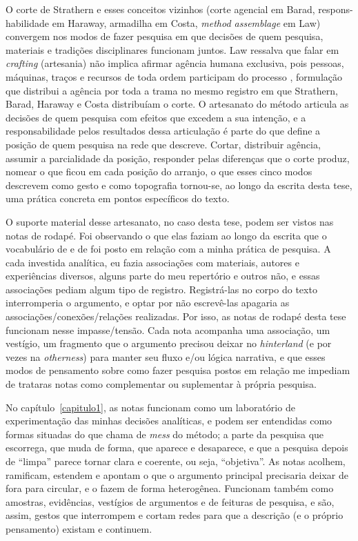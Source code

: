 O corte de Strathern e esses conceitos vizinhos (corte agencial em Barad, respons-habilidade em Haraway, armadilha em Costa, \textit{method assemblage} em Law) convergem nos modos de fazer pesquisa em que decisões de quem pesquisa, materiais e tradições disciplinares funcionam juntos. Law ressalva que falar em \textit{crafting} (artesania) não implica afirmar agência humana exclusiva, pois pessoas, máquinas, traços e recursos de toda ordem participam do processo \parencite[pp.~41--42]{Law2004After}, formulação que distribui a agência por toda a trama no mesmo registro em que Strathern, Barad, Haraway e Costa distribuíam o corte. O artesanato do método articula as decisões de quem pesquisa com efeitos que excedem a sua intenção, e a responsabilidade pelos resultados dessa articulação é parte do que define a posição de quem pesquisa na rede que descreve. Cortar, distribuir agência, assumir a parcialidade da posição, responder pelas diferenças que o corte produz, nomear o que ficou em cada posição do arranjo, o que esses cinco modos descrevem como gesto e como topografia tornou-se, ao longo da escrita desta tese, uma prática concreta em pontos específicos do texto.

O suporte material desse artesanato, no caso desta tese, podem ser vistos nas notas de rodapé.
Foi observando o que elas faziam ao longo da escrita que o vocabulário de \textcite{strathern2011cortando} e de \textcite{Law2004After} foi posto em relação com a minha prática de pesquisa. A cada investida analítica, eu fazia associações com materiais, autores e experiências diversos, alguns parte do meu repertório e outros não, e essas associações pediam algum tipo de registro. Registrá-las no corpo do texto interromperia o argumento, e optar por não escrevê-las apagaria as associações/conexões/relações realizadas. Por isso, as notas de rodapé desta tese funcionam nesse impasse/tensão. Cada nota acompanha uma associação, um vestígio, um fragmento que o argumento precisou deixar no \textit{hinterland} (e por vezes na \textit{otherness}) para manter seu fluxo e/ou lógica narrativa, e que esses modos de pensamento sobre como fazer pesquisa postos em relação me impediam de trataras notas como complementar ou suplementar à própria pesquisa.

No capítulo~\ref{capitulo1}, as notas funcionam como um laboratório de experimentação das minhas decisões analíticas, e podem ser entendidas como formas situadas do que \textcite{Law2004After} chama de \textit{mess} do método; a parte da pesquisa que escorrega, que muda de forma, que aparece e desaparece, e que a pesquisa depois de \enquote{limpa} parece tornar clara e coerente, ou seja, \enquote{objetiva}. As notas acolhem, ramificam, estendem e apontam o que o argumento principal precisaria deixar de fora para circular, e o fazem de forma heterogênea. Funcionam também como amostras, evidências, vestígios de argumentos e de feituras de pesquisa, e são, assim, gestos que interrompem e cortam redes para que a descrição (e o próprio pensamento) existam e continuem.

